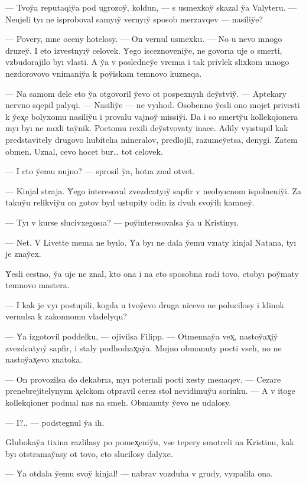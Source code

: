 \documentclass[10pt]{book}
\begin{document}
— Tvoy̆a reputaqiy̆a pod ugrozoy̆, koldun, — s usmexkoy̆ skazal y̆a Valyteru. — Neujeli tyı ne isproboval samyıy̆ vernyıy̆ sposob merzavqev — nasiliy̆e?

— Povery, mne oceny hotelosy. — On vernul usmexku. — No u nevo mnogo druzey̆. I eto izvestnyıy̆ celovek. Y̆ego isceznoveniy̆e, ne govorıa uje o smerti, vzbudorajilo byı vlasti. A y̆a v posledney̆e vremıa i tak privlek slixkom mnogo nezdorovovo vnimaniy̆a k poy̆iskam temnovo kuzneqa.

— Na samom dele eto y̆a otgovoril y̆evo ot pospexnyıh dey̆stviy̆. — Aptekary nervno sqepil palyqi. — Nasiliy̆e — ne vyıhod. Osobenno y̆esli ono mojet privesti k y̆ex̨e bolyxomu nasiliy̆u i provalu vajnoy̆ missiy̆i. Da i so smerty̆u kollekqionera myı byı ne naxli tay̆nik. Poetomu rexili dey̆stvovaty inace. Adily vyıstupil kak predstavitely drugovo lıubitelıa mineralov, predlojil, razumey̆etsa, denygi. Zatem obmen. Uznal, cevo hocet bur… tot celovek.

— I cto y̆emu nujno? — sprosil y̆a, hotıa znal otvet.

— Kinjal straja. Y̆ego interesoval zvezdcatyıy̆ sapfir v neobyıcnom ispolneniy̆i. Za takuy̆u relikviy̆u on gotov byıl ustupity odin iz dvuh svoy̆ih kamney̆.

— Tyı v kurse slucivxegosıa? — poy̆interesovalsa y̆a u Kristinyı.

— Net. V Livette menıa ne byılo. Y̆a byı ne dala y̆emu vzıaty kinjal Natana, tyı je znay̆ex.

Y̆esli cestno, y̆a uje ne znal, kto ona i na cto sposobna radi tovo, ctobyı poy̆maty temnovo mastera.

— I kak je vyı postupili, kogda u tvoy̆evo druga nicevo ne polucilosy i klinok vernulsa k zakonnomu vladelyqu?

— Y̆a izgotovil poddelku, — ojivilsa Filipp. — Otmennay̆a vex̨, nastoy̆ax̨iy̆ zvezdcatyıy̆ sapfir, i staly podhodıax̨ay̆a. Mojno obmanuty pocti vseh, no ne nastoy̆ax̨evo znatoka.

— On provozilsa do dekabrıa, myı poterıali pocti xesty mesıaqev. — Cezare prenebrejitelynyım x̨elckom otpravil cerez stol nevidimuy̆u sorinku. — A v itoge kollekqioner podnıal nas na smeh. Obmanuty y̆evo ne udalosy.

— I?.. — podstegnul y̆a ih.

Glubokay̆a tixina razlilasy po pomex̨eniy̆u, vse tepery smotreli na Kristinu, kak byı otstranıay̆asy ot tovo, cto slucilosy dalyxe.

— Y̆a otdala y̆emu svoy̆ kinjal! — nabrav vozduha v grudy, vyıpalila ona.
\end{document}
